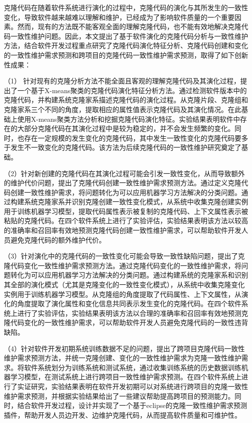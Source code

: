 

克隆代码在随着软件系统进行演化的过程中，克隆代码的演化与其所发生的一致性变化，导致软件越来越难以理解和维护，已经成为了影响软件质量的一个重要因素。然而，现有的方法既不能客观全面的理解克隆代码，也不能有效地解决克隆代码一致性维护问题。因此，本文提出了基于软件演化的克隆代码分析与一致性维护方法，结合软件开发过程重点研究了克隆代码演化特征分析、克隆代码创建和变化的一致性维护需求预测和跨项目的克隆代码一致性维护需求预测，取得了如下创新性成果：

（1） 针对现有的克隆分析方法不能全面且客观的理解克隆代码及其演化过程，提出了一个基于X-means聚类的克隆代码演化特征分析方法。通过检测软件版本中的克隆代码，并构建系统克隆家系描述克隆代码的演化过程。从克隆片段、克隆组和克隆家系三个不同的角度，提取相应的属性值表示克隆代码及其演化情况。在此基础上使用X-means聚类方法分析和挖掘克隆代码演化特征。实验结果表明软件中存在的大部分克隆代码在其演化过程中是较为稳定的，并不会发生频繁的变化。同时，也存在一定规模的发生变化的克隆代码，其中发生一致性变化的克隆代码要多于发生不一致变化的克隆代码。该方法为后续克隆代码的一致性维护研究奠定了基础。

（2）针对新创建的克隆代码在其演化过程可能会引发一致性变化，从而导致额外的维护代价问题，提出了克隆代码创建一致性维护需求预测方法。通过定义克隆代码创建一致性维护需求，将问题转化为可以应用机器学习方法解决的分类问题。通过构建系统克隆家系并识别克隆创建一致性变化模式，从系统中收集克隆创建实例用于训练机器学习模型，提取代码属性表示被复制的克隆代码、上下文属性表示被粘贴的克隆代码。在四个软件系统上进行了实验评估，实验结果表明该方法以较高的准确率和召回率有效地预测克隆代码创建一致性维护需求，可以帮助软件开发人员避免克隆代码的额外维护代价。

（3）针对演化中的克隆代码的一致性变化可能会导致一致性缺陷问题，提出了克隆代码变化一致性维护需求预测方法。通过克隆代码变化的一致性维护需求，将问题转化为可以应用机器学习方法解决的分类问题。通过构建系统的克隆家系和识别其全部的演化模式（尤其是克隆变化的一致性变化模式），从系统中收集克隆变化实例用于训练机器学习模型。从克隆组的角度提取了代码属性、上下文属性，从演化的角度提取了演化属性和变化信息共同表示发生变化的克隆代码。在四个软件系统上进行了实验评估，实验结果表明该方法以合理的准确率和召回率有效地预测克隆代码变化的一致性维护需求，可以帮助软件开发人员避免克隆代码的一致性违背缺陷。

（4）针对软件开发初期系统训练数据不足的问题，提出了跨项目克隆代码一致性维护需求预测方法，并统一克隆创建、变化的一致性维护需求为克隆一致性维护需求。将软件系统划分为训练系统和测试系统，通过收集训练系统的历史数据训练机器学习模型，在测试系统上进行跨项目一致性维护需求预测。在四个软件系统上进行了实证研究，实验结果表明在软件开发初期可以对系统进行跨项目的克隆一致性维护需求预测，并根据实验结果给出了一些建议帮助提高跨项目的预测能力。同时，结合软件开发过程，设计并实现了一个基于eclipse的克隆一致性维护需求预测插件，帮助开发人员边开发、边维护克隆代码，从而提高软件质量和可维护性。

